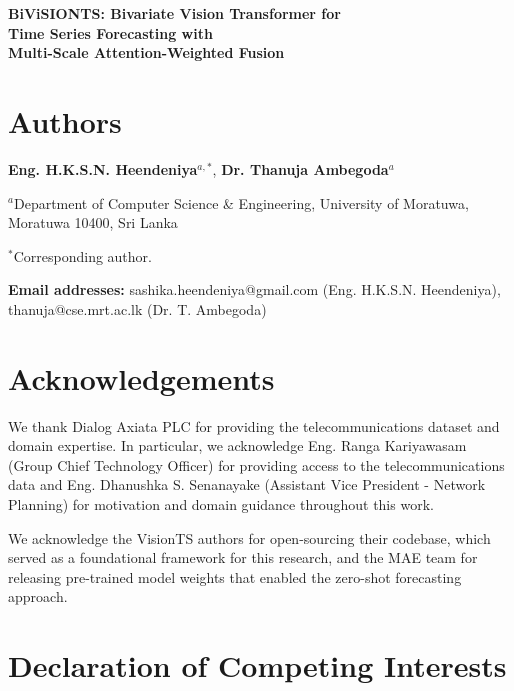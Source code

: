 \documentclass[12pt]{article}
\begin{document}
\begin{center}
{\LARGE \textbf{BiViSIONTS: Bivariate Vision Transformer for\\[0.3em] Time Series Forecasting with\\[0.3em] Multi-Scale Attention-Weighted Fusion}}
\end{center}

\vspace{2em}

\section*{Authors}

\textbf{Eng. H.K.S.N. Heendeniya}$^{a,*}$, \textbf{Dr. Thanuja Ambegoda}$^{a}$

\vspace{1em}

$^{a}$Department of Computer Science \& Engineering, University of Moratuwa, Moratuwa 10400, Sri Lanka

\vspace{1em}

$^{*}$Corresponding author.

\vspace{0.5em}

\textbf{Email addresses:} sashika.heendeniya@gmail.com (Eng. H.K.S.N. Heendeniya), thanuja@cse.mrt.ac.lk (Dr. T. Ambegoda)

\vspace{2em}

\section*{Acknowledgements}

We thank Dialog Axiata PLC for providing the telecommunications dataset and domain expertise. In particular, we acknowledge Eng. Ranga Kariyawasam (Group Chief Technology Officer) for providing access to the telecommunications data and Eng. Dhanushka S. Senanayake (Assistant Vice President - Network Planning) for motivation and domain guidance throughout this work.

We acknowledge the VisionTS authors for open-sourcing their codebase, which served as a foundational framework for this research, and the MAE team for releasing pre-trained model weights that enabled the zero-shot forecasting approach.

\vspace{2em}

\section*{Declaration of Competing Interests}
\end{document}
